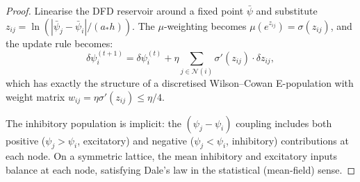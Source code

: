 \documentclass[11pt]{article}
\theoremstyle{definition}
\theoremstyle{remark}
\begin{document}
\begin{proof}
Linearise the DFD reservoir around a fixed point $\bar\psi$ and substitute
$z_{ij} = \ln(|\bar\psi_j - \bar\psi_i|/(a_* h))$. The $\mu$-weighting
becomes $\mu(e^{z_{ij}}) = \sigma(z_{ij})$, and the update rule becomes:
\begin{equation}
  \delta\psi_i^{(t+1)} = \delta\psi_i^{(t)} + \eta\sum_{j \in \mathcal{N}(i)}
  \sigma'(z_{ij}) \cdot \delta z_{ij},
\end{equation}
which has exactly the structure of a discretised Wilson--Cowan E-population
with weight matrix $w_{ij} = \eta\sigma'(z_{ij}) \leq \eta/4$.

The inhibitory population is implicit: the $(\psi_j - \psi_i)$ coupling
includes both positive ($\psi_j > \psi_i$, excitatory) and negative
($\psi_j < \psi_i$, inhibitory) contributions at each node. On a symmetric
lattice, the mean inhibitory and excitatory inputs balance at each node,
satisfying Dale's law in the statistical (mean-field) sense.
\end{proof}
\end{document}
